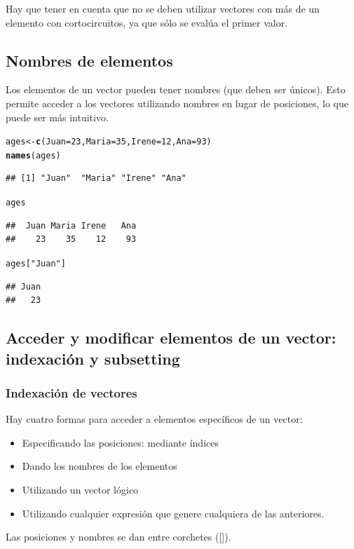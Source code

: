 \documentclass{config/apuntes}\usepackage[]{graphicx}\usepackage[]{xcolor}
\makeatletter
\newcommand{\hlnum}[1]{\textcolor[rgb]{0.686,0.059,0.569}{#1}}%
\newcommand{\hlsng}[1]{\textcolor[rgb]{0.192,0.494,0.8}{#1}}%
\newcommand{\hldef}[1]{\textcolor[rgb]{0.345,0.345,0.345}{#1}}%
\newcommand{\hlkwb}[1]{\textcolor[rgb]{0.69,0.353,0.396}{#1}}%
\newcommand{\hlkwc}[1]{\textcolor[rgb]{0.333,0.667,0.333}{#1}}%
\newcommand{\hlkwd}[1]{\textcolor[rgb]{0.737,0.353,0.396}{\textbf{#1}}}%
\newenvironment{kframe}{%
 \def\at@end@of@kframe{}%
 \ifinner\ifhmode%
  \def\at@end@of@kframe{\end{minipage}}%
  \begin{minipage}{\columnwidth}%
 \fi\fi%
 \def\FrameCommand##1{\hskip\@totalleftmargin \hskip-\fboxsep
 \colorbox{shadecolor}{##1}\hskip-\fboxsep
     \hskip-\linewidth \hskip-\@totalleftmargin \hskip\columnwidth}%
 \MakeFramed {\advance\hsize-\width
   \@totalleftmargin\z@ \linewidth\hsize
   \@setminipage}}%
 {\par\unskip\endMakeFramed%
 \at@end@of@kframe}
\newenvironment{knitrout}{}{} %
\makeatother
\begin{document}
Hay que tener en cuenta que no se deben utilizar vectores con más de un elemento con cortocircuitos, ya que sólo se evalúa el primer valor. 

\subsection{Nombres de elementos}
Los elementos de un vector pueden tener nombres (que deben ser únicos). Esto permite acceder a los vectores utilizando nombres en lugar de posiciones, lo que puede ser más intuitivo. 

\begin{knitrout}
\color{fgcolor}\begin{kframe}
\begin{alltt}
\hldef{ages} \hlkwb{<-} \hlkwd{c}\hldef{(}\hlkwc{Juan} \hldef{=} \hlnum{23}\hldef{,} \hlkwc{Maria} \hldef{=} \hlnum{35}\hldef{,} \hlkwc{Irene} \hldef{=} \hlnum{12}\hldef{,} \hlkwc{Ana} \hldef{=} \hlnum{93}\hldef{)}
\hlkwd{names}\hldef{(ages)}
\end{alltt}
\begin{verbatim}
## [1] "Juan"  "Maria" "Irene" "Ana"
\end{verbatim}
\begin{alltt}
\hldef{ages}
\end{alltt}
\begin{verbatim}
##  Juan Maria Irene   Ana 
##    23    35    12    93
\end{verbatim}
\begin{alltt}
\hldef{ages[}\hlsng{"Juan"}\hldef{]}
\end{alltt}
\begin{verbatim}
## Juan 
##   23
\end{verbatim}
\end{kframe}
\end{knitrout}

\subsection{Acceder y modificar elementos de un vector: indexación y subsetting}
\subsubsection{Indexación de vectores}
Hay cuatro formas para acceder a elementos específicos de un vector:
\begin{itemize}
\item Especificando las posiciones: mediante índices
\item Dando los nombres de los elementos
\item Utilizando un vector lógico
\item Utilizando cualquier expresión que genere cualquiera de las anteriores.
\end{itemize}
Las posiciones y nombres se dan entre corchetes ([]).
\end{document}
